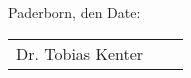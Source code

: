 \vspace*{.5cm}
\ifgerman
Paderborn, den
\else
Date:
\fi
\vspace*{1cm}
\begin{center}
	\begin{tabular}{l p{} r}
	  \cline{1-1} \cline{3-3}
	  \begin{minipage}[t]{0.4\textwidth}
	    \centering
	    Dr. Tobias Kenter
		\end{minipage}
		&
		\begin{minipage}[t]{0.2\textwidth}
		\end{minipage}
		&
		\begin{minipage}[t]{0.4\textwidth}
		  \centering
		  \Author
		\end{minipage}
	\end{tabular}
\end{center}
